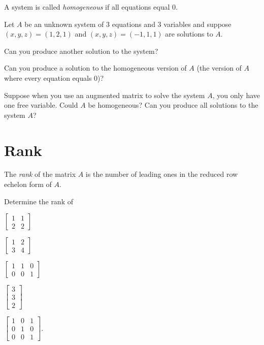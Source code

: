 \documentclass{problemset}
\newcommand{\mat}[1]{\begin{bmatrix}#1\end{bmatrix}}
\begin{document}
	\question
	\begin{definition}[Homogeneous]
		A system is called \emph{homogeneous} if all equations equal $0$.
	\end{definition}

		Let $A$ be an unknown system of $3$ equations and $3$ variables and suppose
		 $(x,y,z)=(1,2,1)$ and
		$(x,y,z)=(-1,1,1)$ are solutions to $A$.
	\begin{parts}
		\item Can you produce another solution
		to the system?

		\item  Can you
		produce a solution to the homogeneous version of $A$ (the version of $A$ where every
		equation equals 0)?

		\item Suppose when you use an augmented matrix to solve the system $A$, you only have 
		one free variable.  Could $A$ be homogeneous?  Can you produce all solutions to the system $A$?
	\end{parts}



\section*{Rank}
	\begin{definition}[Rank]
		The \emph{rank} of the matrix $A$ is the number of leading ones in the 
		reduced row echelon form of $A$.
	\end{definition}

	\question
	\begin{parts}
		\item Determine the rank of
		\begin{enumerate*}
			\item $\mat{1&1\\2&2}$
			\item $\mat{1&2\\3&4}$
			\item $\mat{1&1&0\\0&0&1}$
			\item $\mat{3\\3\\2}$
			\item $\mat{1&0&1\\0&1&0\\0&0&1}$.
		\end{enumerate*}
	\end{parts}
	
\end{document}
